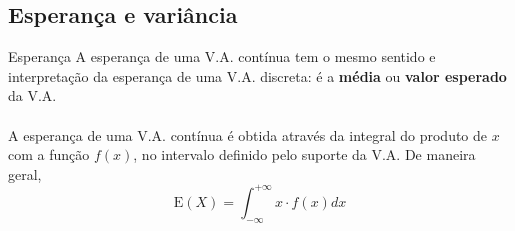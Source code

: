 \documentclass[10pt]{beamer}\usepackage[]{graphicx}\usepackage[]{color}
\providecommand{\E}{\text{E}}
\providecommand{\Var}{\text{Var}}
\theoremstyle{definition}
\begin{document}


\subsection{Esperança e variância}

\begin{frame}[fragile]{Esperança}
  A esperança de uma V.A. contínua tem o mesmo sentido e interpretação
  da esperança de uma V.A. discreta: é a \textbf{média} ou \textbf{valor
    esperado} da V.A. \\~\\
  A esperança de uma V.A. contínua é obtida através da integral do
  produto de $x$ com a função $f(x)$, no intervalo definido pelo suporte
  da V.A. De maneira geral,
  \begin{equation*}
    \E(X) = \int_{-\infty}^{+\infty} x \cdot f(x) dx
  \end{equation*}
\end{frame}
\end{document}
